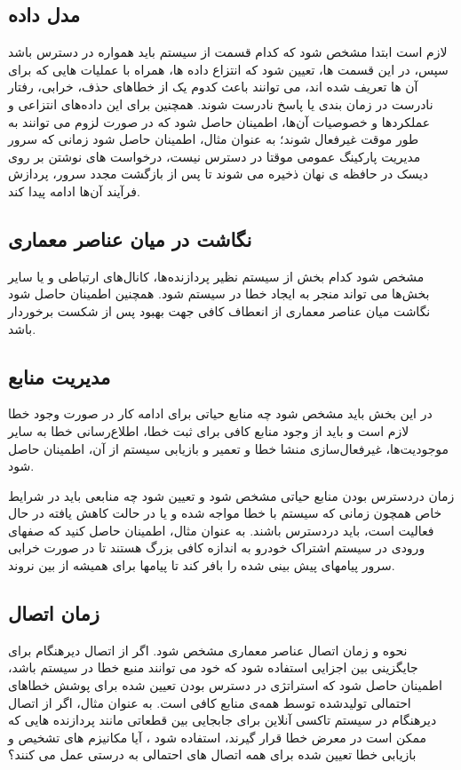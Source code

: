 \subsection{مدل داده}
لازم است ابتدا مشخص شود که کدام قسمت از سیستم باید همواره در دسترس باشد سپس، در این قسمت ها، تعیین شود که انتزاع داده ها، همراه با عملیات هایی که برای آن ها تعریف شده اند، می توانند باعث کدوم یک از خطاهای حذف، خرابی، رفتار نادرست در زمان بندی یا پاسخ نادرست شوند.
همچنین برای این داده‌های انتزاعی و عملکردها و خصوصیات آن‌ها، اطمینان حاصل شود که در صورت لزوم می توانند به طور موقت غیرفعال شوند؛ به عنوان مثال، اطمینان حاصل شود زمانی که سرور مدیریت پارکینگ عمومی موقتا در دسترس نیست، درخواست های نوشتن بر روی دیسک در حافظه ی نهان ذخیره می شوند تا پس از بازگشت مجدد سرور، پردازش فرآیند آن‌ها ادامه پیدا کند.
\subsection{نگاشت در میان عناصر معماری}
مشخص شود کدام بخش از سیستم نظیر پردازنده‌ها، کانال‌های ارتباطی و یا سایر بخش‌ها می تواند منجر به ایجاد خطا در سیستم شود. همچنین اطمینان حاصل شود نگاشت میان عناصر معماری از انعطاف کافی جهت بهبود پس از شکست برخوردار باشد.
\subsection{مدیریت منابع}
در این بخش باید مشخص شود چه منابع حیاتی برای ادامه کار در صورت وجود خطا لازم است و باید از وجود منابع کافی برای ثبت خطا، اطلاع‌رسانی خطا به سایر موجودیت‌ها، غیر‌فعال‌سازی منشا خطا و تعمیر و بازیابی سیستم از آن، اطمینان حاصل شود.

زمان در‌دسترس بودن منابع حیاتی مشخص شود و تعیین شود چه منابعی باید در شرایط خاص همچون زمانی که سیستم با خطا مواجه شده و یا در حالت کاهش یافته در حال فعالیت است، باید در‌دسترس باشند. به عنوان مثال، اطمینان حاصل کنید که صفهای ورودی در سیستم اشتراک خودرو به اندازه کافی بزرگ هستند تا در صورت خرابی سرور پیامهای پیش بینی شده را بافر کند تا پیامها برای همیشه از بین نروند.
\subsection{زمان اتصال}
نحوه و زمان اتصال عناصر معماری مشخص شود. اگر از اتصال دیرهنگام برای جایگزینی بین اجزایی استفاده شود که خود می توانند منبع خطا در سیستم باشد، اطمینان حاصل شود که استراتژی در دسترس بودن تعیین شده برای پوشش خطاهای احتمالی تولید‌شده توسط همه‌ی منابع کافی است. به عنوان مثال، اگر از اتصال دیرهنگام در سیستم تاکسی آنلاین برای جابجایی بین قطعاتی مانند پردازنده هایی که ممکن است در معرض خطا قرار گیرند، استفاده شود ، آیا مکانیزم های تشخیص و بازیابی خطا تعیین شده برای همه اتصال های احتمالی به درستی عمل می کنند؟
